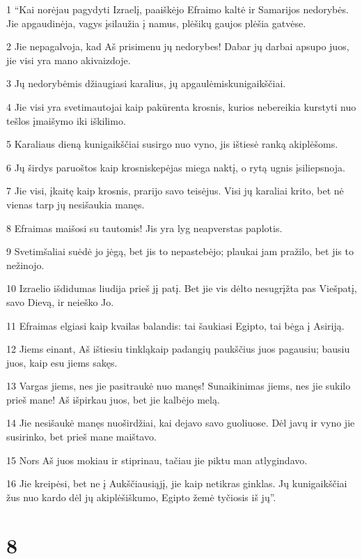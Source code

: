 \par 1 “Kai norėjau pagydyti Izraelį, paaiškėjo Efraimo kaltė ir Samarijos nedorybės. Jie apgaudinėja, vagys įsilaužia į namus, plėšikų gaujos plėšia gatvėse. 
\par 2 Jie nepagalvoja, kad Aš prisimenu jų nedorybes! Dabar jų darbai apsupo juos, jie visi yra mano akivaizdoje. 
\par 3 Jų nedorybėmis džiaugiasi karalius, jų apgaulėmis­kunigaikščiai. 
\par 4 Jie visi yra svetimautojai kaip pakūrenta krosnis, kurios nebereikia kurstyti nuo tešlos įmaišymo iki iškilimo. 
\par 5 Karaliaus dieną kunigaikščiai susirgo nuo vyno, jis ištiesė ranką akiplėšoms. 
\par 6 Jų širdys paruoštos kaip krosnis­kepėjas miega naktį, o rytą ugnis įsiliepsnoja. 
\par 7 Jie visi, įkaitę kaip krosnis, prarijo savo teisėjus. Visi jų karaliai krito, bet nė vienas tarp jų nesišaukia manęs. 
\par 8 Efraimas maišosi su tautomis! Jis yra lyg neapverstas paplotis. 
\par 9 Svetimšaliai suėdė jo jėgą, bet jis to nepastebėjo; plaukai jam pražilo, bet jis to nežinojo. 
\par 10 Izraelio išdidumas liudija prieš jį patį. Bet jie vis dėlto nesugrįžta pas Viešpatį, savo Dievą, ir neieško Jo. 
\par 11 Efraimas elgiasi kaip kvailas balandis: tai šaukiasi Egipto, tai bėga į Asiriją. 
\par 12 Jiems einant, Aš ištiesiu tinklą­kaip padangių paukščius juos pagausiu; bausiu juos, kaip esu jiems sakęs. 
\par 13 Vargas jiems, nes jie pasitraukė nuo manęs! Sunaikinimas jiems, nes jie sukilo prieš mane! Aš išpirkau juos, bet jie kalbėjo melą. 
\par 14 Jie nesišaukė manęs nuoširdžiai, kai dejavo savo guoliuose. Dėl javų ir vyno jie susirinko, bet prieš mane maištavo. 
\par 15 Nors Aš juos mokiau ir stiprinau, tačiau jie piktu man atlygindavo. 
\par 16 Jie kreipėsi, bet ne į Aukščiausiąjį, jie kaip netikras ginklas. Jų kunigaikščiai žus nuo kardo dėl jų akiplėšiškumo, Egipto žemė tyčiosis iš jų”.



\chapter{8}


